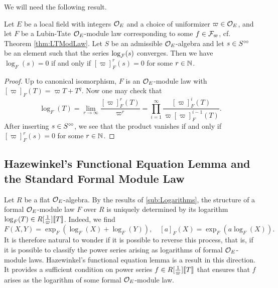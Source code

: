 \documentclass[../main.tex]{subfiles}
\begin{document}
We will need the following result.
\begin{lem}\label{lem:KernelOfLog}
  Let $E$ be a local field with integers $\mathcal{O}_E$ and a choice of uniformizer $\varpi \in \mathcal{O}_E$, 
  and let $F$ be a Lubin-Tate $\mathcal{O}_E$-module law corresponding to some 
  $f \in \mathcal{F}_\varpi$, cf. Theorem \ref{thm:LTModLaw}. Let $S$ be an admissible 
  $\mathcal{O}_E$-algebra and let $s \in S^{\circ \hspace{-0.5pt} \circ}$ be an element such that the
  series $\log_{\mathcal{F}}(s)$ 
  converges. Then we have $\log_F(s) = 0$ if and only if $[\varpi]^r_F(s) = 0$ for
  some $r \in \mathbb{N}$. 
\begin{proof}
  Up to canonical isomorphism, $F$ is an $\mathcal{O}_E$-module law with $[\varpi]_F(T) =
  \varpi T + T^q$. Now one may check that 
  \begin{equation*}
    \log_F(T) = \lim_{r \to \infty} \frac{ [\varpi]_F^r(T) }{\varpi^r} = \prod_{i=1}^\infty 
    \frac{[\varpi]^i_F(T)}{\varpi [\varpi]^{i-1}_F(T)}.
  \end{equation*}
  After inserting
  $s \in S^{\circ \hspace{-0.5pt} \circ}$, we see that the product vanishes if and only if $[\varpi]_F^r(s) = 0$
  for some $r \in \mathbb{N}$. 
\end{proof}
\end{lem}

\subsection{Hazewinkel's Functional Equation Lemma and the Standard Formal Module Law} %
\label{sub:Hazewinkels FuncEq and the Standard Formal Module}
Let $R$ be a flat $\mathcal{O}_E$-algebra. By the results of \cref{sub:Logarithms}, the
structure of a formal 
$\mathcal{O}_E$-module law $F$ over $R$ is uniquely determined by its logarithm $\log_F(T)
\in R [\tfrac 1\varpi] \llbracket T \rrbracket$. Indeed, we find
\begin{equation*}
  F(X,Y) = \exp_F(\log_F(X)+\log_F(Y)), \quad [a]_F(X) = \exp_F(a \log_F(X)).
\end{equation*}
It is therefore natural to wonder if it is possible to reverse this process, that
is, if it is possible to classify the power series arising as logarithms of 
formal $\mathcal{O}_E$-module laws.  Hazewinkel's 
functional equation lemma is a result in this direction. It provides a
sufficient condition on power series $f \in R[\tfrac 1 \varpi]\llbracket T \rrbracket$
that ensures that $f$ arises as the logarithm of some formal $\mathcal{O}_E$-module law.
\end{document}

